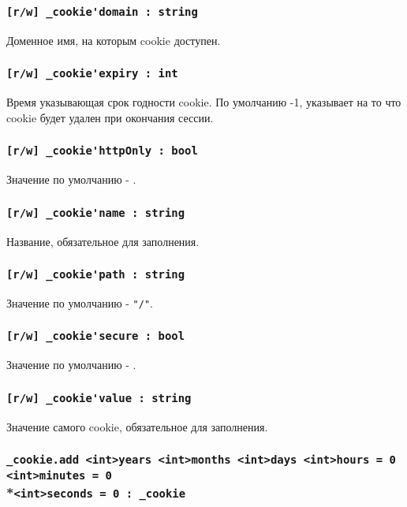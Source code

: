 \documentclass[a4paper, 14pt]{extarticle}
\begin{document}
\subsubsection{\lstinline|[r/w] _cookie'domain : string|}

Доменное имя, на которым cookie доступен.

\subsubsection{\lstinline|[r/w] _cookie'expiry : int|}

Время указывающая срок годности cookie. По умолчанию -1, указывает на то что cookie будет удален при окончания сессии.

\subsubsection{\lstinline|[r/w] _cookie'httpOnly : bool|}

Значение по умолчанию - \false.

\subsubsection{\lstinline|[r/w] _cookie'name : string|}

Название, обязательное для заполнения.

\subsubsection{\lstinline|[r/w] _cookie'path : string|}

Значение по умолчанию - \lstinline|"/"|.

\subsubsection{\lstinline|[r/w] _cookie'secure : bool|}

Значение по умолчанию - \false.

\subsubsection{\lstinline|[r/w] _cookie'value : string|}

Значение самого cookie, обязательное для заполнения.

\subsubsection{\lstinline|_cookie.add <int>years <int>months <int>days <int>hours = 0 <int>minutes = 0|\\*\noindent\lstinline|<int>seconds = 0 : _cookie|}
\end{document}
